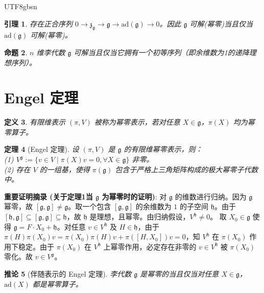 \documentclass[11pt]{article}
\newtheorem{theorem}{定理}[section]
\newtheorem{lemma}[theorem]{引理}
\newtheorem{proposition}[theorem]{命题}
\newtheorem{corollary}[theorem]{推论}
\newtheorem{definition}[theorem]{定义}
\begin{document}
\begin{CJK*}{UTF8}{gbsn}
\begin{lemma}
存在正合序列 $0 \to \mathfrak{z}_{\mathfrak{g}} \to \mathfrak{g} \to \mathrm{ad}(\mathfrak{g}) \to 0$。因此 $\mathfrak{g}$ 可解(幂零)当且仅当 $\mathrm{ad}(\mathfrak{g})$ 可解(幂零)。
\end{lemma}

\begin{proposition}
$n$ 维李代数 $\mathfrak{g}$ 可解当且仅当它拥有一个初等序列（即余维数为1的递降理想序列）。
\end{proposition}

\section{Engel 定理}

\begin{definition}
有限维表示 $(\pi, V)$ 被称为幂零表示，若对任意 $X \in \mathfrak{g}$，$\pi(X)$ 均为幂零算子。
\end{definition}

\begin{theorem}[Engel 定理]
设 $(\pi, V)$ 是 $\mathfrak{g}$ 的有限维幂零表示，则：\\
(1) $V^{\mathfrak{g}} := \{v \in V \mid \pi(X)v = 0, \forall X \in \mathfrak{g}\}$ 非零。\\
(2) 存在 $V$ 的一组基，使得 $\pi(\mathfrak{g})$ 包含于严格上三角矩阵构成的极大幂零子代数中。
\end{theorem}
\textbf{重要证明摘录 (关于定理1当 $\mathfrak{g}$ 为幂零时的证明)}:
对 $\mathfrak{g}$ 的维数进行归纳。因为 $\mathfrak{g}$ 幂零，故 $[\mathfrak{g}, \mathfrak{g}] \neq \mathfrak{g}$。取一个包含 $[\mathfrak{g}, \mathfrak{g}]$ 的余维数为 $1$ 的子空间 $\mathfrak{h}$。由于 $[\mathfrak{h}, \mathfrak{g}] \subseteq [\mathfrak{g}, \mathfrak{g}] \subseteq \mathfrak{h}$，故 $\mathfrak{h}$ 是理想，且幂零。由归纳假设，$V^{\mathfrak{h}} \neq 0$。
取 $X_0 \in \mathfrak{g}$ 使得 $\mathfrak{g} = F \cdot X_0 + \mathfrak{h}$。对任意 $v \in V^{\mathfrak{h}}$ 及 $H \in \mathfrak{h}$，由于 $\pi(H)\pi(X_0)v = \pi(X_0)\pi(H)v + \pi([H, X_0])v = 0$，知 $V^{\mathfrak{h}}$ 在 $\pi(X_0)$ 作用下稳定。由于 $\pi(X_0)$ 在 $V^{\mathfrak{h}}$ 上幂零作用，必定存在非零的 $v \in V^{\mathfrak{h}}$ 被 $\pi(X_0)$ 零化。故 $v \in V^{\mathfrak{g}}$。

\begin{corollary}[伴随表示的 Engel 定理]
李代数 $\mathfrak{g}$ 是幂零的当且仅当对任意 $X \in \mathfrak{g}$，$\mathrm{ad}(X)$ 都是幂零算子。
\end{corollary}


\end{CJK*}
\end{document}
